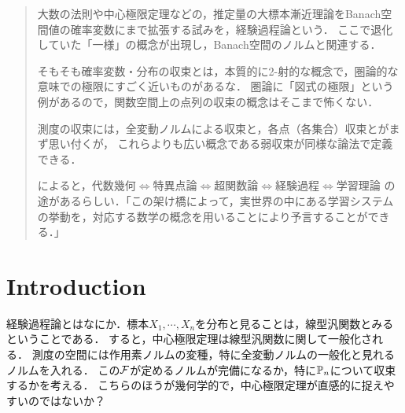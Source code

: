 \documentclass[uplatex,dvipdfmx]{jsreport}
\begin{document}
\begin{quotation}
    大数の法則や中心極限定理などの，推定量の大標本漸近理論をBanach空間値の確率変数にまで拡張する試みを，経験過程論という．
    ここで退化していた「一様」の概念が出現し，Banach空間のノルムと関連する．

    そもそも確率変数・分布の収束とは，本質的に2-射的な概念で，圏論的な意味での極限にすごく近いものがあるな．
    圏論に「図式の極限」という例があるので，関数空間上の点列の収束の概念はそこまで怖くない．

    測度の収束には，全変動ノルムによる収束と，各点（各集合）収束とがまず思い付くが，
    これらよりも広い概念である弱収束が同様な論法で定義できる．

    \cite{渡辺澄夫}によると，代数幾何$\Leftrightarrow$特異点論$\Leftrightarrow$超関数論$\Leftrightarrow$経験過程$\Leftrightarrow$学習理論
    の途があるらしい．「この架け橋によって，実世界の中にある学習システムの挙動を，対応する数学の概念を用いることにより予言することができる．」
\end{quotation}

\section{Introduction}

\begin{tcolorbox}[colframe=ForestGreen, colback=ForestGreen!10!white,breakable,colbacktitle=ForestGreen!40!white,coltitle=black,fonttitle=\bfseries\sffamily,
title=経験過程論]
    経験過程論とはなにか．標本$X_1,\cdots,X_n$を分布と見ることは，線型汎関数とみるということである．
    すると，中心極限定理は線型汎関数に関して一般化される．
    測度の空間には作用素ノルムの変種，特に全変動ノルムの一般化と見れるノルムを入れる．
    この$\mathcal{F}$が定めるノルムが完備になるか，特に$\mathbb{P}_n$について収束するかを考える．
    こちらのほうが幾何学的で，中心極限定理が直感的に捉えやすいのではないか？
\end{tcolorbox}
\end{document}
